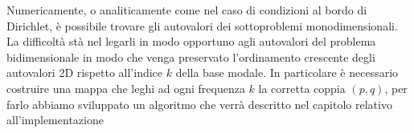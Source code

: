 Numericamente, o analiticamente come nel caso di condizioni al bordo di Dirichlet, \`e possibile
trovare gli autovalori dei sottoproblemi monodimensionali. La difficolt\`a
st\`a nel legarli in modo opportuno agli autovalori del problema bidimensionale in modo che 
venga preservato l'ordinamento crescente degli autovalori 2D rispetto all'indice $k$ della base modale.
In particolare \`e necessario costruire una mappa che leghi ad ogni frequenza $k$ 
la corretta coppia $(p,q)$, per farlo abbiamo sviluppato un algoritmo che verr\`a descritto 
nel capitolo relativo all'implementazione
\clearpage